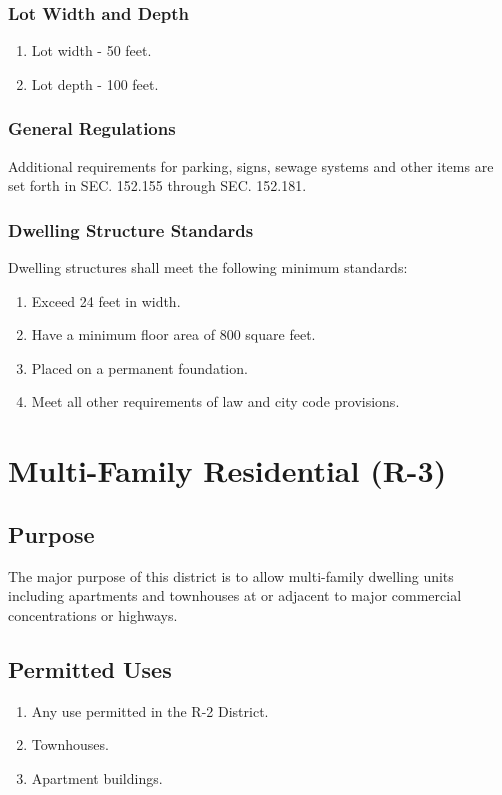 \subsubsection{Lot Width and Depth}
\begin{enumerate}[{\indent}a)]
    \item Lot width - 50 feet.
    \item Lot depth - 100 feet.
\end{enumerate}
\subsubsection{General Regulations}
Additional requirements for parking, signs, sewage systems and other items are set forth in SEC. 152.155 through SEC. 152.181.
\subsubsection{Dwelling Structure Standards}
Dwelling structures shall meet the following minimum standards:
\begin{enumerate}[{\indent}a)]
    \item Exceed 24 feet in width.
    \item Have a minimum floor area of 800 square feet.
    \item Placed on a permanent foundation.
    \item Meet all other requirements of law and city code provisions.
\end{enumerate}

\section{Multi-Family Residential (R-3)}
\subsection{Purpose}
The major purpose of this district is to allow multi-family dwelling units including apartments and townhouses at or adjacent to major commercial concentrations or highways.
\subsection{Permitted Uses}
\begin{enumerate}[{\indent}1)]
    \item Any use permitted in the R-2 District.
    \item Townhouses.
    \item Apartment buildings.
\end{enumerate}

